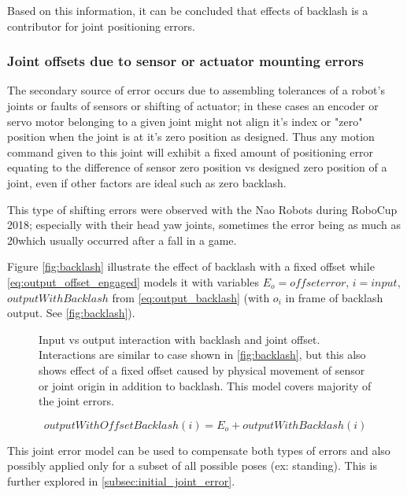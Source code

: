 \documentclass[english, printversion, nomenclature, notitle]{tuvisionthesis} %
\makeatletter
\renewcommand{\todo}[2][]{\tikzexternaldisable\@todo[#1]{#2}\tikzexternalenable}
\makeatother
\begin{document}
Based on this information, it can be concluded that effects of backlash is a contributor for joint positioning errors.

\subsubsection{Joint offsets due to sensor or actuator mounting errors}

The secondary source of error occurs due to assembling tolerances of a robot's joints or faults of sensors or shifting of actuator; in these cases an encoder or servo motor belonging to a given joint might not align it's index or "zero" position when the joint is at it's zero position as designed. Thus any motion command given to this joint will exhibit a fixed amount of positioning error equating to the difference of sensor zero position vs designed zero position of a joint, even if other factors are ideal such as zero backlash.

This type of shifting errors were observed with the Nao Robots during RoboCup 2018; especially with their head yaw joints, sometimes the error being as much as 20\degree which usually occurred after a fall in a game. \todo{is this right? for this place}

Figure \ref{fig:backlash} illustrate the effect of backlash with a fixed offset while \cref{eq:output_offset_engaged} models it with variables $E_o = offset error$, $i = input$, $outputWithBacklash$ from \cref{eq:output_backlash} (with $o_i$ in frame of backlash output. See \cref{fig:backlash}).

\begin{figure}
	\def\svgwidth{\linewidth}
	
	\caption{Input vs output interaction with backlash and joint offset. Interactions are similar to case shown in \ref{fig:backlash}, but this also shows effect of a fixed offset caused by physical movement of sensor or joint origin in addition to backlash. This model covers majority of the joint errors.}
	\label{fig:backlash_offset}
\end{figure}

\begin{equation}
outputWithOffsetBacklash(i) = E_o + outputWithBacklash(i)
\label{eq:output_offset_engaged}
\end{equation}

This joint error model can be used to compensate both types of errors and also possibly applied only for a subset of all possible poses (ex: standing). This is further explored in \cref{subsec:initial_joint_error}.
\end{document}
